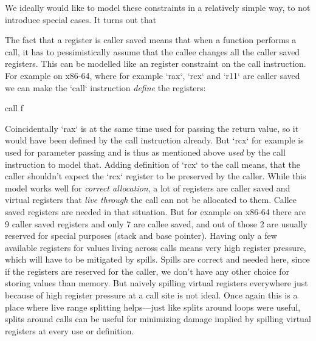 We ideally would like to model these constraints in a relatively simple
way, to not introduce special cases. It turns out that 

The fact that a register is caller saved means that when a function performs a
call, it has to pessimistically assume that the callee changes all the caller
saved registers.
This can be modelled like an register constraint on the call instruction. For
example on x86-64, where for example `rax`, `rcx` and `r11` are caller saved we
can make the `call` instruction {\em define} the registers:

\begtt
call f %
\endtt

Coincidentally `rax` is at the same time used for passing the return value, so
it would have been defined by the call instruction already. But `rcx` for
example is used for parameter passing and is thus as mentioned above {\em used}
by the call instruction to model that. Adding definition of `rcx` to the call
means, that the caller shouldn't expect the `rcx` register to be preserved by
the caller. While this model works well for {\em correct allocation}, a lot of
registers are caller saved and virtual registers that {\em live through} the
call can not be allocated to them. Callee saved registers are needed in that
situation. But for example on x86-64 there are 9 caller saved registers and only
7 are callee saved, and out of those 2 are usually reserved for special purposes
(stack and base pointer). Having only a few available registers for values
living across calls means very high register pressure, which will have to be
mitigated by spills. Spills are correct and needed here, since if the registers
are reserved for the caller, we don't have any other choice for storing values
than memory. But naively spilling virtual registers everywhere just because of
high register pressure at a call site is not ideal. Once again this is a place
where live range splitting helps---just like splits around loops were useful,
splits around calls can be useful for minimizing damage implied by spilling
virtual registers at every use or definition.

